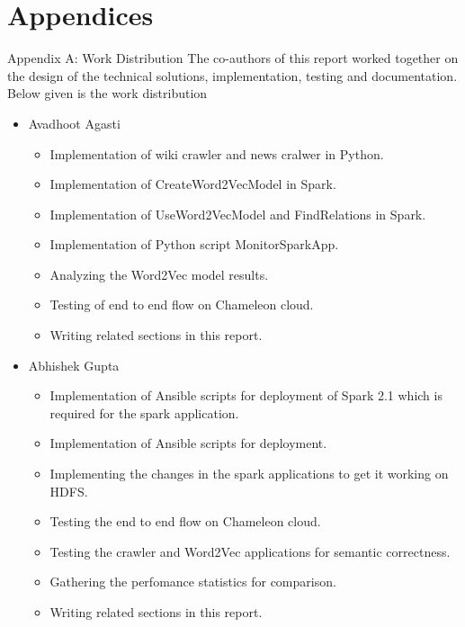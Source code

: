 \documentclass[9pt,twocolumn,twoside]{../../styles/osajnl}
\begin{document}
\section{Appendices}
Appendix A: Work Distribution
The co-authors of this report worked together on the design of the technical
solutions, implementation, testing and documentation. Below given is the work
 distribution
\begin{itemize}
\item Avadhoot Agasti
    \begin{itemize}
    \item Implementation of wiki crawler and news cralwer in Python.
    \item Implementation of CreateWord2VecModel in Spark.
    \item Implementation of UseWord2VecModel and FindRelations in Spark.
    \item Implementation of Python script MonitorSparkApp.
    \item Analyzing the Word2Vec model results.
    \item Testing of end to end flow on Chameleon cloud.
    \item Writing related sections in this report.
    \end{itemize}

\item Abhishek Gupta
    \begin{itemize}
    \item Implementation of Ansible scripts for deployment of Spark 2.1 which
     is required for the spark application.
    \item Implementation of Ansible scripts for deployment.
    \item Implementing the changes in the spark applications to get it
    working on HDFS.
    \item Testing the end to end flow on Chameleon cloud.
    \item Testing the crawler and Word2Vec applications for semantic
    correctness.
    \item Gathering the perfomance statistics for comparison.
    \item Writing related sections in this report.
    \end{itemize}
\end{itemize}



\end{document}

